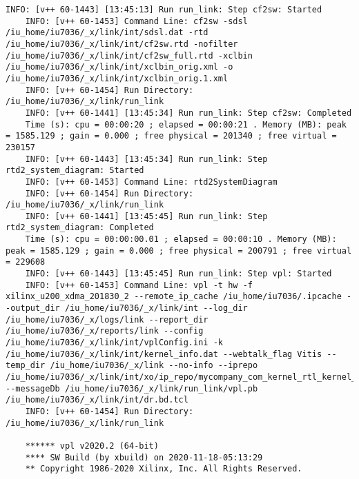 \begin{lstlisting}[caption=Содержимое файла v++\_vinc.log, label={log1}]
	INFO: [v++ 60-1443] [13:45:13] Run run_link: Step cf2sw: Started
	INFO: [v++ 60-1453] Command Line: cf2sw -sdsl /iu_home/iu7036/_x/link/int/sdsl.dat -rtd /iu_home/iu7036/_x/link/int/cf2sw.rtd -nofilter /iu_home/iu7036/_x/link/int/cf2sw_full.rtd -xclbin /iu_home/iu7036/_x/link/int/xclbin_orig.xml -o /iu_home/iu7036/_x/link/int/xclbin_orig.1.xml
	INFO: [v++ 60-1454] Run Directory: /iu_home/iu7036/_x/link/run_link
	INFO: [v++ 60-1441] [13:45:34] Run run_link: Step cf2sw: Completed
	Time (s): cpu = 00:00:20 ; elapsed = 00:00:21 . Memory (MB): peak = 1585.129 ; gain = 0.000 ; free physical = 201340 ; free virtual = 230157
	INFO: [v++ 60-1443] [13:45:34] Run run_link: Step rtd2_system_diagram: Started
	INFO: [v++ 60-1453] Command Line: rtd2SystemDiagram
	INFO: [v++ 60-1454] Run Directory: /iu_home/iu7036/_x/link/run_link
	INFO: [v++ 60-1441] [13:45:45] Run run_link: Step rtd2_system_diagram: Completed
	Time (s): cpu = 00:00:00.01 ; elapsed = 00:00:10 . Memory (MB): peak = 1585.129 ; gain = 0.000 ; free physical = 200791 ; free virtual = 229608
	INFO: [v++ 60-1443] [13:45:45] Run run_link: Step vpl: Started
	INFO: [v++ 60-1453] Command Line: vpl -t hw -f xilinx_u200_xdma_201830_2 --remote_ip_cache /iu_home/iu7036/.ipcache --output_dir /iu_home/iu7036/_x/link/int --log_dir /iu_home/iu7036/_x/logs/link --report_dir /iu_home/iu7036/_x/reports/link --config /iu_home/iu7036/_x/link/int/vplConfig.ini -k /iu_home/iu7036/_x/link/int/kernel_info.dat --webtalk_flag Vitis --temp_dir /iu_home/iu7036/_x/link --no-info --iprepo /iu_home/iu7036/_x/link/int/xo/ip_repo/mycompany_com_kernel_rtl_kernel_wizard_2_1_0 --messageDb /iu_home/iu7036/_x/link/run_link/vpl.pb /iu_home/iu7036/_x/link/int/dr.bd.tcl
	INFO: [v++ 60-1454] Run Directory: /iu_home/iu7036/_x/link/run_link
	
	****** vpl v2020.2 (64-bit)
	**** SW Build (by xbuild) on 2020-11-18-05:13:29
	** Copyright 1986-2020 Xilinx, Inc. All Rights Reserved.
	

\end{lstlisting}

